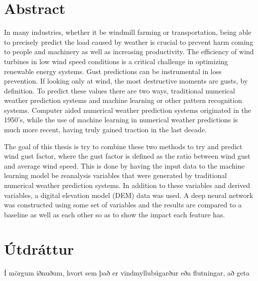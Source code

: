 \documentclass[a4paper,12pt,twoside,BCOR=10mm]{scrbook}
\begin{document}
\cleardoublepage


\setcounter{page}{5}

\section*{Abstract}
In many industries, whether it be windmill farming or transportation, being able to precisely predict the load caused by weather is crucial to prevent harm coming to people and machinery as well as increasing productivity. The efficiency of wind turbines in low wind speed conditions is a critical challenge in optimizing renewable energy systems. Gust predictions can be instrumental in loss prevention. If looking only at wind, the most destructive moments are gusts, by definition. To predict these values there are two ways, traditional numerical weather prediction systems and machine learning or other pattern recognition systems. Computer aided numerical weather prediction systems originated in the 1950's, while the use of machine learning in numerical weather predictions is much more recent, having truly gained traction in the last decade.

The goal of this thesis is try to combine these two methods to try and predict wind gust factor, where the gust factor is defined as the ratio between wind gust and average wind speed. This is done by having the input data to the machine learning model be reanalysis variables that were generated by traditional numerical weather prediction systems. In addition to these variables and derived variables, a digital elevation model (DEM) data was used. A deep neural network was constructed using some set of variables and the results are compared to a baseline as well as each other so as to show the impact each feature has.
\vfill \vspace*{1cm}

\section*{Útdráttur}
Í mörgum iðnuðum, hvort sem það er vindmyllubúgarður eða flutningar, að geta 
\vfill
\end{document}
